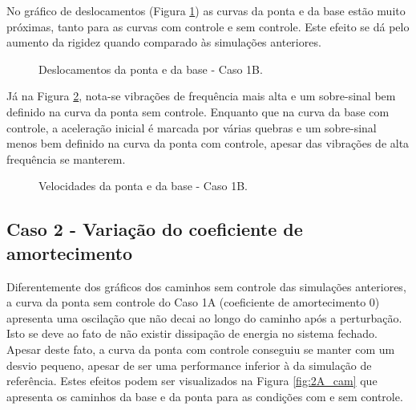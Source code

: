 No gráfico de deslocamentos (Figura \ref{fig:1B_des}) as curvas da ponta e da base estão muito próximas, tanto para as curvas com controle e sem controle. Este efeito se dá pelo aumento da rigidez quando comparado às simulações anteriores.

\begin{figure}[H]
    \centering
    \hfill
    \caption{Deslocamentos da ponta e da base - Caso 1B.}
    \label{fig:1B_des}
\end{figure}

Já na Figura \ref{fig:1B_vel}, nota-se vibrações de frequência mais alta e um sobre-sinal bem definido na curva da ponta sem controle. Enquanto que na curva da base com controle, a aceleração inicial é marcada por várias quebras e um sobre-sinal menos bem definido na curva da ponta com controle, apesar das vibrações de alta frequência se manterem.

\begin{figure}[H]
    \centering
    \hfill
    \caption{Velocidades da ponta e da base - Caso 1B.}
    \label{fig:1B_vel}
\end{figure}


\subsection{Caso 2 - Variação do coeficiente de amortecimento}

Diferentemente dos gráficos dos caminhos sem controle das simulações anteriores, a curva da ponta sem controle do Caso 1A (coeficiente de amortecimento \(0\)) apresenta uma oscilação que não decai ao longo do caminho após a perturbação. Isto se deve ao fato de não existir dissipação de energia no sistema fechado. Apesar deste fato, a curva da ponta com controle conseguiu se manter com um desvio pequeno, apesar de ser uma performance inferior à da simulação de referência. Estes efeitos podem ser visualizados na Figura \ref{fig:2A_cam} que apresenta os caminhos da base e da ponta para as condições com e sem controle.

